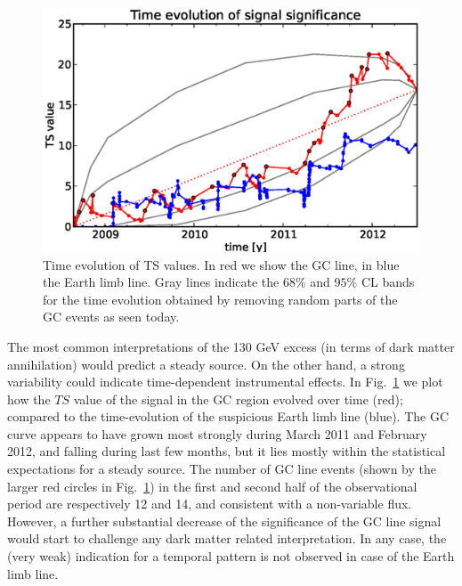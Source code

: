 \documentclass[aps,twocolumn,prd,superscriptaddress,showpacs,nofootinbib,fixfloat]{revtex4}
\begin{document}
\begin{figure}
  \begin{center}
    \includegraphics[width=1.0\linewidth]{plots/TS_time.eps}
  \end{center}
  \caption{Time evolution of TS values. In red we show the
  GC line, in blue the Earth limb line. Gray lines indicate
  the $68\%$ and $95\%$ CL bands for the time evolution
  obtained by removing random parts of the GC events as seen
  today.}
  \label{fig:timeevolution}
\end{figure}

The most common interpretations of the 130 GeV excess (in
terms of dark matter annihilation) would predict a steady
source. On the other hand, a strong variability could
indicate time-dependent instrumental effects. In
Fig.~\ref{fig:timeevolution} we plot how the $TS$ value of
the signal in the GC region evolved over time (red);
compared to the time-evolution of the suspicious Earth limb
line (blue). The GC curve appears to have grown most
strongly during March 2011 and February 2012, and falling
during last few months, but it lies mostly within the
statistical expectations for a steady source. The number of
GC line events (shown by the larger red circles in
Fig.~\ref{fig:timeevolution}) in the first and second half
of the observational period are respectively 12 and 14, and
consistent with a non-variable flux. However, a further
substantial decrease of the significance of the GC line
signal would start to challenge any dark matter related
interpretation.  In any case, the (very weak) indication for
a temporal pattern is not observed in case of the Earth limb
line. 


\end{document}
